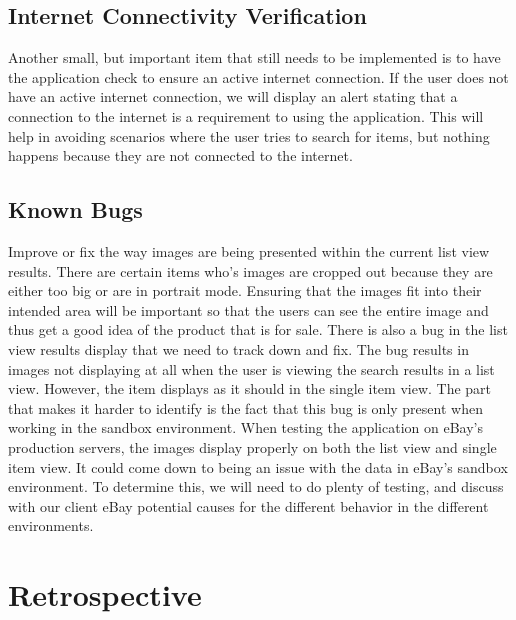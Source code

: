 \documentclass[journal,compsoc, 10pt, draftclsnofoot, onecolumn]{IEEEtran}
\begin{document}
\subsection{Internet Connectivity Verification}
Another small, but important item that still needs to be implemented is to 
have the application check to ensure an active internet connection. If the 
user does not have an active internet connection, we will display an alert 
stating that a connection to the internet is a requirement to using the 
application.  This will help in avoiding scenarios where the user tries to 
search for items, but nothing happens because they are not connected to the 
internet. 

\subsection{Known Bugs}
Improve or fix the way images are being presented within the current list view 
results. There are certain items who's images are cropped out because they are 
either too big or are in portrait mode. Ensuring that the images fit into their 
intended area will be important so that the users can see the entire image and 
thus get a good idea of the product that is for sale. There is also a bug in 
the list view results display that we need to track down and fix. The bug 
results in images not displaying at all when the user is viewing the search 
results in a list view. However, the item displays as it should in the single 
item view. The part that makes it harder to identify is the fact that this bug 
is only present when working in the sandbox environment. When testing the 
application on eBay's production servers, the images display properly on both 
the list view and single item view. It could come down to being an issue with 
the data in eBay's sandbox environment. To determine this, we will need to do 
plenty of testing, and discuss with our client eBay potential causes for the 
different behavior in the different environments. 


\section{Retrospective}
\end{document}
